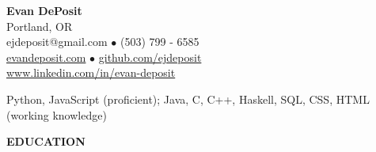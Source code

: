 \documentclass[11pt]{article}
\begin{document}
\thispagestyle{empty}
\begin{center}
\noindent \Large{\textbf{Evan DePosit}}\\
\large{Portland, OR}\\
\large{ejdeposit@gmail.com $\bullet$ (503) 799 - 6585}\\
\href{http://evandeposit.com}{\large{evandeposit.com}} $\bullet$
\href{http://github.com/ejdeposit}{\large{github.com/ejdeposit}}\\
\href{http://www.linkedin.com/in/evan-deposit}{\large{www.linkedin.com/in/evan-deposit}}
\end{center}
\medskip
\begin{description}[style=multiline,leftmargin=3.2cm,font=\normalfont]
\item[\textbf{LANGUAGES:}] Python, JavaScript (proficient); Java, C, C++,  Haskell, SQL, CSS, HTML (working knowledge)
\end{description}
\noindent
\makebox[0pt][l]{\rule[-.2\baselineskip]{\linewidth}{.3mm}}%
\large{\textbf{EDUCATION}} \smallskip \\
\end{document}
